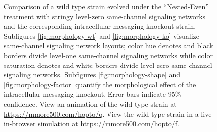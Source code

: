 \begin{figure}[!htbp]
\begin{center}
\caption{
Comparison of a wild type strain evolved under the ``Nested-Even'' treatment with stringy level-zero same-channel signaling networks and the corresponding intracellular-messaging knockout strain.
Subfigures \ref{fig:morphology-wt} and \ref{fig:morphology-ko} visualize same-channel signaling network layouts;
color hue denotes and black borders divide level-one same-channel signaling networks while
color saturation denotes and white borders divide level-zero same-channel signaling networks.
Subfigures \ref{fig:morphology-shape} and \ref{fig:morphology-factor} quantify the morphological effect of the intracellular-messaging knockout.
Error bars indicate 95\% confidence.
View an animation of the wild type strain at \url{https://mmore500.com/hopto/q}.
View the wild type strain in a live in-browser simulation at \url{https://mmore500.com/hopto/f}.
}
\label{fig:ko-morphology}
\end{center}
\end{figure}
